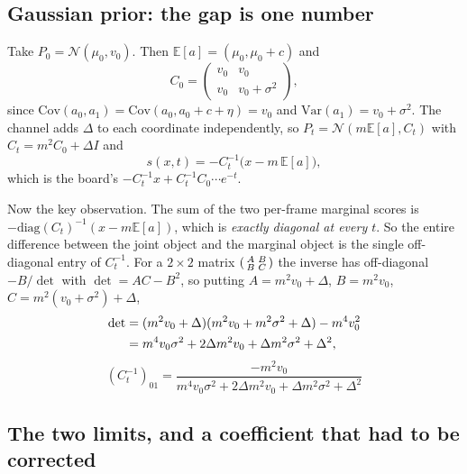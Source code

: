\documentclass[11pt]{article}
\theoremstyle{plain}
\theoremstyle{remark}
\newcommand{\N}{\mathcal{N}}
\newcommand{\E}{\mathbb{E}}
\newcommand{\score}{s}
\begin{document}
\subsection{Gaussian prior: the gap is one number}

Take $P_0 = \N(\mu_0, v_0)$. Then $\E[a] = (\mu_0, \mu_0+c)$ and
\begin{equation}
  C_0 = \begin{pmatrix} v_0 & v_0 \\ v_0 & v_0 + \sigma^2\end{pmatrix},
\end{equation}
since $\mathrm{Cov}(a_0, a_1) = \mathrm{Cov}(a_0, a_0 + c + \eta) = v_0$ and
$\mathrm{Var}(a_1) = v_0 + \sigma^2$. The channel adds $\Delta$ to each
coordinate independently, so $P_t = \N(m\E[a], C_t)$ with
$C_t = m^2 C_0 + \Delta I$ and
\begin{equation}
  \score(x,t) = -C_t^{-1}\bigl(x - m\,\E[a]\bigr),
  \label{eq:p2score}
\end{equation}
which is the board's $-C_t^{-1}x + C_t^{-1}C_0\cdots e^{-t}$.

Now the key observation. The sum of the two per-frame marginal scores is
$-\mathrm{diag}(C_t)^{-1}(x - m\E[a])$, which is \emph{exactly diagonal at every
$t$}. So the entire difference between the joint object and the marginal object
is the single off-diagonal entry of $C_t^{-1}$. For a $2\times2$ matrix
$\begin{psmallmatrix}A&B\\B&C\end{psmallmatrix}$ the inverse has off-diagonal
$-B/\det$ with $\det = AC - B^2$, so putting $A = m^2v_0 + \Delta$,
$B = m^2 v_0$, $C = m^2(v_0+\sigma^2)+\Delta$,
\begin{align}
  \det &= (m^2v_0+\Delta)(m^2v_0 + m^2\sigma^2 + \Delta) - m^4v_0^2 \notag\\
       &= m^4 v_0\sigma^2 + 2\Delta m^2 v_0 + \Delta m^2 \sigma^2 + \Delta^2,
  \label{eq:p2det}
\end{align}
\begin{equation}
  \boxed{\ (C_t^{-1})_{01}
  = \frac{-m^2 v_0}
    {m^4 v_0\sigma^2 + 2\Delta m^2 v_0 + \Delta m^2\sigma^2 + \Delta^2}\ }
  \label{eq:p2coup}
\end{equation}

\subsection{The two limits, and a coefficient that had to be corrected}
\end{document}
